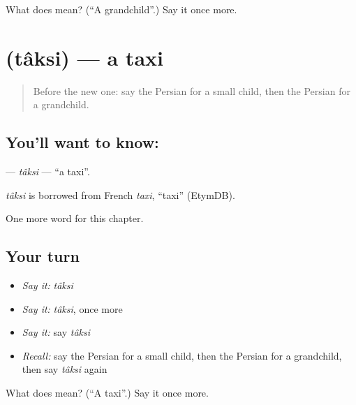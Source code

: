 \begin{tcolorbox}[breakable,colback=teal!4,colframe=teal!35!black,title={Before you move on}]
What does  mean? (\textquotedblleft{}A grandchild\textquotedblright{}.) Say it once more.
\end{tcolorbox}
\section[\texorpdfstring{\fa{تاکسی} (tâksi)}{تاکسی (tâksi)}]{ (tâksi) — a taxi}

\label{lesson:FA-C117-taksi}



\begin{quote}
Before the new one: say the Persian for a small child, then the Persian for a grandchild.
\end{quote}

\subsection*{You'll want to know: }
\textbf{} — \emph{tâksi} — \textquotedblleft{}a taxi\textquotedblright{}.

\begin{cousinweb}
\emph{tâksi} is borrowed from French \emph{taxi}, \textquotedblleft{}taxi\textquotedblright{} (EtymDB).
\end{cousinweb}

\begin{grammarlens}[title={What you've built}]
One more word for this chapter.
\end{grammarlens}

\subsection*{Your turn}
\begin{itemize}
\raggedright
  \item \emph{Say it:} \emph{tâksi}
  \item \emph{Say it:} \emph{tâksi}, once more
  \item \emph{Say it:} say \emph{tâksi}
  \item \emph{Recall:} say the Persian for a small child, then the Persian for a grandchild, then say \emph{tâksi} again
\end{itemize}

\begin{tcolorbox}[breakable,colback=teal!4,colframe=teal!35!black,title={Before you move on}]
What does  mean? (\textquotedblleft{}A taxi\textquotedblright{}.) Say it once more.
\end{tcolorbox}
